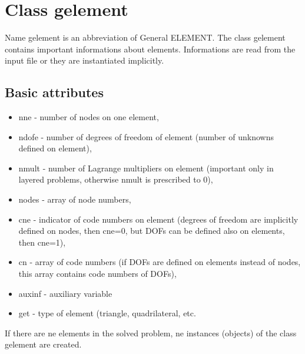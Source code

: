 \section{Class {\sf gelement}}
\label{gtopologygelement}
Name {\sf gelement} is an abbreviation of General ELEMENT. The class {\sf gelement} contains important
informations about elements. Informations are read from the input file or they are instantiated
implicitly.
\subsection{Basic attributes}
\begin{itemize}
\item{{\sf nne} - number of nodes on one element,}
\item{{\sf ndofe} - number of degrees of freedom of element (number of unknowns defined on element),}
\item{{\sf nmult} - number of Lagrange multipliers on element (important only in layered problems, otherwise
nmult is prescribed to 0),}
\item{{\sf nodes} - array of node numbers,}
\item{{\sf cne} - indicator of code numbers on element (degrees of freedom are implicitly defined on nodes,
then cne=0, but DOFs can be defined also on elements, then cne=1),}
\item{{\sf cn} - array of code numbers (if DOFs are defined on elements instead of nodes, this array contains
code numbers of DOFs),}
\item{{\sf auxinf} - auxiliary variable}
\item{{\sf get} - type of element (triangle, quadrilateral, etc.}
\end{itemize}
If there are {\sf ne} elements in the solved problem, {\sf ne} instances (objects) of the class {\sf gelement} are created.

